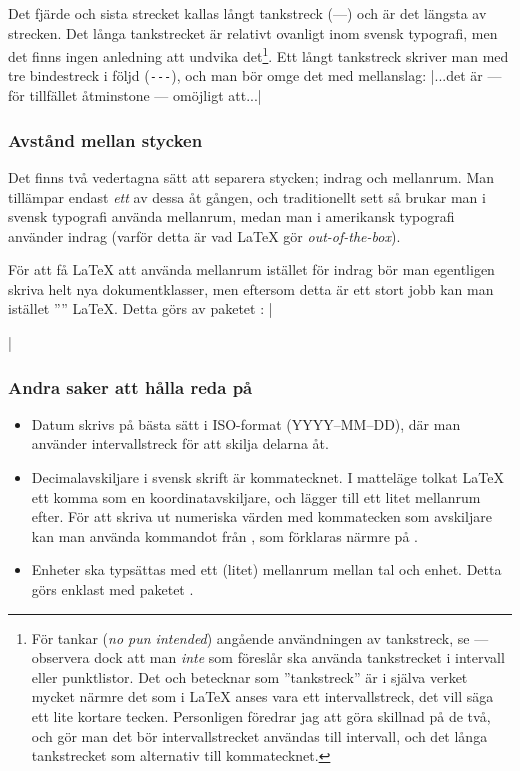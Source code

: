 \documentclass[lang=sv,ptsize=10pt,font=none,nomath,titles=bf,../../a4.tex]{subfiles}
\begin{document}
Det fjärde och sista strecket kallas långt tankstreck (—) och är det längsta av
strecken. Det långa tankstrecket är relativt ovanligt inom svensk typografi, men det
finns ingen anledning att undvika det\footnote{För tankar (\emph{no pun
intended}) angående användningen av tankstreck, se 
\textcite[\ppno~46–47]{LIU98} — observera dock att man \emph{inte} som 
\citeauthor*{LIU98} föreslår ska använda tankstrecket i intervall eller
punktlistor. Det \textcite{Sprakradet08} och \citeauthor*{LIU98} betecknar som
”tankstreck” är i själva verket mycket närmre det som i \LaTeX{} anses vara ett
intervallstreck, det vill säga ett lite kortare tecken. Personligen föredrar jag 
att göra skillnad på de två, och gör man det bör intervallstrecket användas till
intervall, och det långa tankstrecket som alternativ till kommatecknet.}.
Ett långt tankstreck skriver man med tre bindestreck i följd
(\verb|---|), och man bör omge det med mellanslag:
\latex|...det är --- för tillfället åtminstone --- omöjligt att...|

\subsubsection{Avstånd mellan stycken}
Det finns två vedertagna sätt att separera stycken; indrag och
mellanrum. Man tillämpar endast \emph{ett} av dessa åt gången, och
traditionellt sett så brukar man i svensk typografi använda mellanrum,
medan man i amerikansk typografi använder indrag (varför detta är vad
\LaTeX{} gör \emph{out-of-the-box}).

För att få \LaTeX{} att använda mellanrum istället för indrag bör man
egentligen skriva helt nya dokumentklasser, men eftersom detta är ett
stort jobb kan man istället ”” \LaTeX{}. Detta görs av
paketet :
\latex|\usepackage{parskip}|

\subsubsection{Andra saker att hålla reda på}
\begin{itemize}
\item Datum skrivs på bästa sätt i ISO-format (YYYY–MM–DD), där man
	använder intervallstreck för att skilja delarna åt.
	
\item Decimalavskiljare i svensk skrift är kommatecknet. I matteläge
	tolkat \LaTeX{} ett komma som en koordinatavskiljare, och lägger
	till ett litet mellanrum efter. För att skriva ut numeriska värden
	med kommatecken som avskiljare kan man använda kommandot 
	från , som förklaras närmre på .
	
\item Enheter ska typsättas med ett (litet) mellanrum mellan tal och
	enhet. Detta görs enklast med paketet .
\end{itemize}
\end{document}
